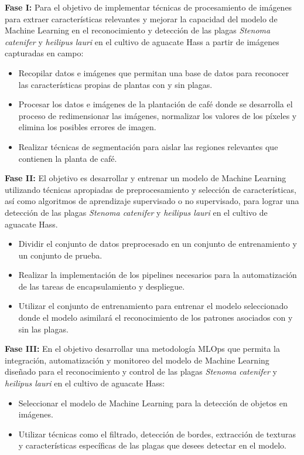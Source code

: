 \textbf{Fase I:} Para el objetivo de implementar técnicas de procesamiento de imágenes para extraer características relevantes y mejorar la capacidad del modelo de Machine Learning en el reconocimiento y detección de las plagas \textit{Stenoma catenifer} y \textit{heilipus lauri} en el cultivo de aguacate Hass a partir de imágenes capturadas en campo:
\begin{itemize}
    \item Recopilar datos e imágenes que permitan una base de datos para reconocer las características propias de plantas con y sin plagas.
    \item Procesar los datos e imágenes de la plantación de café donde se desarrolla el proceso de redimensionar las imágenes, normalizar los valores de los píxeles y elimina los posibles errores de imagen.
    \item Realizar técnicas de segmentación para aislar las regiones relevantes que contienen la planta de café.
\end{itemize}

\textbf{Fase II:} El objetivo es desarrollar y entrenar un modelo de Machine Learning utilizando técnicas apropiadas de preprocesamiento y selección de características, así como algoritmos de aprendizaje supervisado o no supervisado, para lograr una detección de las plagas \textit{Stenoma catenifer} y \textit{heilipus lauri} en el cultivo de aguacate Hass.
\begin{itemize}
    \item Dividir el conjunto de datos preprocesado en un conjunto de entrenamiento y un conjunto de prueba.
    \item Realizar la implementación de los pipelines necesarios para la automatización de las tareas de encapsulamiento y despliegue.
    \item Utilizar el conjunto de entrenamiento para entrenar el modelo seleccionado donde  el modelo asimilará el reconocimiento de los patrones asociados con y sin las plagas.
\end{itemize}

\textbf{Fase III:} En el objetivo desarrollar una metodología MLOps que permita la integración, automatización y monitoreo del modelo de Machine Learning diseñado para el reconocimiento y control de las plagas \textit{Stenoma catenifer} y \textit{heilipus lauri} en el cultivo de aguacate Hass:
\begin{itemize}
    \item Seleccionar el modelo de Machine Learning para la detección de objetos en imágenes.
    \item Utilizar técnicas como el filtrado, detección de bordes, extracción de texturas y características específicas de las plagas que desees detectar en el modelo.
\end{itemize}

